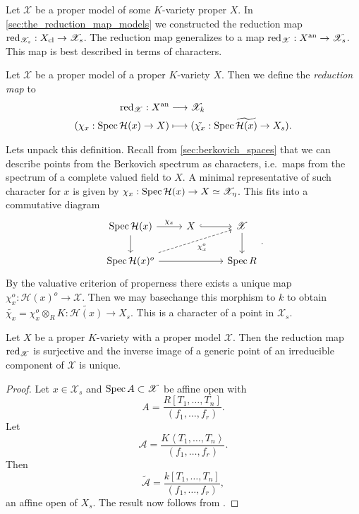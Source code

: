 Let $\mathscr X$ be a proper model of some $K$-variety proper $X$.
In \cref{sec:the_reduction_map_models} we constructed the reduction map $\operatorname{red}_{\mathscr X_s}: X_\text{cl}  \to \mathscr X_s$. 
The reduction map generalizes to a map $\operatorname{red}_{\mathscr X}: X{}^{\text{an}} \to \mathscr X_s$.
This map is best described in terms of characters. 
\begin{definition}
	Let $\mathscr X$ be a proper model of a proper $K$-variety $X$. 
	Then we define the \emph{reduction map} to 
	\begin{align*}
		\operatorname{red}_{\mathscr X}:  X{}^{\text{an}} &\longrightarrow \mathscr X_k \\
		(\chi_x: \operatorname{Spec} \mathcal H(x) \to X) &\longmapsto (\tilde{\chi_x}: \operatorname{Spec} \widetilde{\mathcal H (x)} \to X_s)
	.\end{align*}
\end{definition}
Lets unpack this definition. 
Recall from \cref{sec:berkovich_spaces} that we can describe points from the Berkovich spectrum as characters, i.e.\ maps from the spectrum of a complete valued field to $X$.
A minimal representative of such character for $x$ is given by $\chi_x: \operatorname{Spec} \mathcal{H} (x) \to X \simeq \mathscr X_\eta$. 
This fits into a commutative diagram \[
\begin{tikzcd}
	\spec \mathcal{H} (x) \dar \rar{\chi_x} & X \rar[hookrightarrow] & \mathscr X \dar \\ 
	\spec \mathcal{H} (x)^{o} \ar[dashed]{urr}[']{\chi_x^{o}} \ar{rr} & & \spec R
\end{tikzcd}
.\] 
By the valuative criterion of properness there exists a unique map $\chi_x^{o}: \mathcal{H} (x)^{o} \to \mathscr X$. 
Then we may basechange this morphism to  $k$ to obtain $\widetilde{\chi_x} = \chi_x^{o} \otimes_R K: \widetilde{\mathcal{H} (x)} \to X_s$. 
This is a character of a point in $\mathscr X_s$. 


\begin{proposition}
	Let $X$ be a proper $K$-variety with a proper model $\mathscr X$. 
	Then the reduction map  $\operatorname{red}_{\mathscr X}$ is surjective and the inverse image of a generic point of an irreducible component of $\mathscr X$ is unique. 
\end{proposition}
\begin{proof}
	Let $x \in \mathscr X_s$ and  $\operatorname{Spec} A \subset \mathscr X$ be affine open with \[
		A = \frac{R[T_1, \ldots, T_n]}{(f_1, \ldots, f_r)}
	.\] 
	Let \[
		\mathcal{A}  = \frac{K\left<T_1, \ldots, T_n \right>}{(f_1, \ldots, f_r)}
	.\] 
	Then \[
		\widetilde{\mathcal{A} } = \frac{k[T_1,\ldots, T_n]}{(f_1, \ldots, f_r)}
	,\]  
	an affine open of $X_s$. 
	The result now follows from \cite[prop.\ 2.4.4]{berkovichSpectralTheoryAnalytic2012}.
\end{proof}




